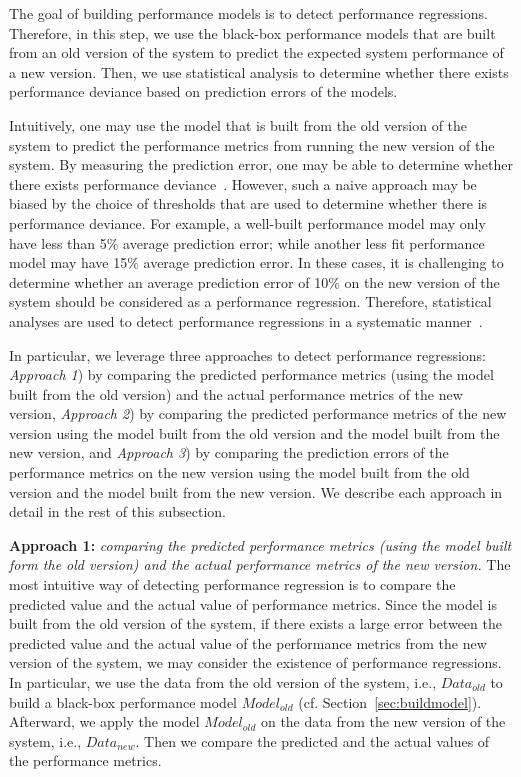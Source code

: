 The goal of building performance models is to detect performance regressions. Therefore, in this step, we use the black-box performance models that are built from an old version of the system to predict the expected system performance of a new version. Then, we use statistical analysis to determine whether there exists performance deviance based on prediction errors of the models.

Intuitively, one may use the model that is built from the old version of the system to predict the performance metrics from running the new version of the system. By measuring the prediction error, one may be able to determine whether there exists performance deviance~\citep{DBLP:conf/osdi/CohenCGKS04,DBLP:conf/wosp/NguyenAJHNF12}. However, such a naive approach may be biased by the choice of thresholds that are used to determine whether there is performance deviance. For example, a well-built performance model may only have less than 5\% average prediction error; while another less fit performance model may have 15\% average prediction error. In these cases, it is challenging to determine whether an average prediction error of 10\% on the new version of the system should be considered as a performance regression. Therefore, statistical analyses are used to detect performance regressions in a systematic manner~\citep{DBLP:conf/icst/GaoJBL16,DBLP:conf/wosp/ShangHNF15,Foo:2015:ICS:2819009.2819034}. 

In particular, we leverage three approaches to detect performance regressions: \emph{Approach 1}) by comparing the predicted performance metrics (using the model built from the old version) and the actual performance metrics of the new version, \emph{Approach 2}) by comparing the predicted performance metrics of the new version using the model built from the old version and the model built from the new version, and \emph{Approach 3}) by comparing the prediction errors of the performance metrics on the new version using the model built from the old version and the model built from the new version. We describe each approach in detail in the rest of this subsection.

\noindent\textbf{Approach 1: }\emph{comparing the predicted performance metrics (using the model built form the old version) and the actual performance metrics of the new version.} %
The most intuitive way of detecting performance regression is to compare the predicted value and the actual value of performance metrics. Since the model is built from the old version of the system, if there exists a large error between the predicted value and the actual value of the performance metrics from the new version of the system, we may consider the existence of performance regressions. In particular, we use the data from the old version of the system, i.e., $Data_{old}$ to build a black-box performance model $Model_{old}$ (cf. Section~\ref{sec:buildmodel}). Afterward, we apply the model $Model_{old}$ on the data from the new version of the system, i.e., $Data_{new}$. Then we compare the predicted and the actual values of the performance metrics.


